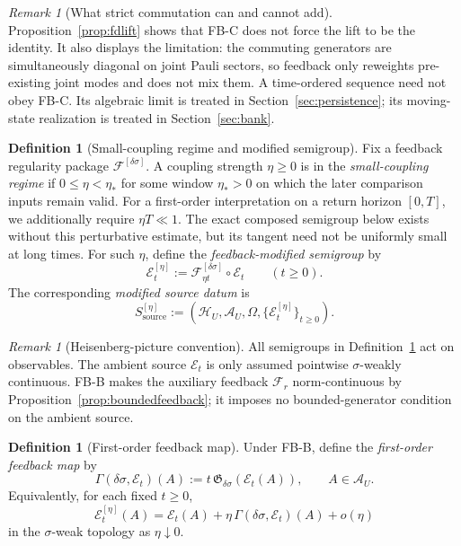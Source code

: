 \documentclass[12pt]{article}
\theoremstyle{definition}
\newtheorem{definition}[theorem]{Definition}
\theoremstyle{remark}
\newtheorem{remark}[theorem]{Remark}
\begin{document}
\begin{remark}[What strict commutation can and cannot add]
Proposition~\ref{prop:fdlift} shows that FB-C does not force the lift to
be the identity. It also displays the limitation: the commuting
generators are simultaneously diagonal on joint Pauli sectors, so
feedback only reweights pre-existing joint modes and does not mix them.
A time-ordered sequence need not obey FB-C. Its algebraic limit is
treated in Section~\ref{sec:persistence}; its moving-state realization
is treated in Section~\ref{sec:bank}.
\end{remark}

\begin{definition}[Small-coupling regime and modified semigroup]
\label{def:modified}
Fix a feedback regularity package
\(\mathscr F^{[\delta\sigma]}\). A coupling strength \(\eta\ge0\) is in
the \emph{small-coupling regime} if \(0\le \eta < \eta_*\) for some
window \(\eta_*>0\) on which the later comparison inputs remain valid.
For a first-order interpretation on a return horizon \([0,T]\), we
additionally require \(\eta T\ll1\). The exact composed semigroup below
exists without this perturbative estimate, but its tangent need not be
uniformly small at long times.
For such \(\eta\), define the \emph{feedback-modified semigroup} by
\[
\mathcal E_t^{[\eta]}
:=
\mathscr F_{\eta t}^{[\delta\sigma]}\circ \mathcal E_t
\qquad
(t\ge0).
\]
The corresponding \emph{modified source datum} is
\[
S_{\mathrm{source}}^{[\eta]}
:=
(\mathcal H_U,\mathcal A_U,\Omega,\{\mathcal E_t^{[\eta]}\}_{t\ge0}).
\]
\end{definition}

\begin{remark}[Heisenberg-picture convention]
All semigroups in Definition~\ref{def:modified} act on observables.
The ambient source \(\mathcal E_t\) is only assumed pointwise
\(\sigma\)-weakly continuous. FB-B makes the auxiliary feedback
\(\mathscr F_r\) norm-continuous by
Proposition~\ref{prop:boundedfeedback}; it imposes no bounded-generator
condition on the ambient source.
\end{remark}

\begin{definition}[First-order feedback map]\label{def:Gamma}
Under FB-B, define the \emph{first-order feedback map} by
\[
\Gamma(\delta\sigma,\mathcal E_t)(A)
:=
t\,\mathfrak G_{\delta\sigma}(\mathcal E_t(A)),
\qquad
A\in\mathcal A_U.
\]
Equivalently, for each fixed \(t\ge0\),
\[
\mathcal E_t^{[\eta]}(A)
=
\mathcal E_t(A)
+
\eta\,\Gamma(\delta\sigma,\mathcal E_t)(A)
+
o(\eta)
\]
in the \(\sigma\)-weak topology as \(\eta\downarrow 0\).
\end{definition}
\end{document}
